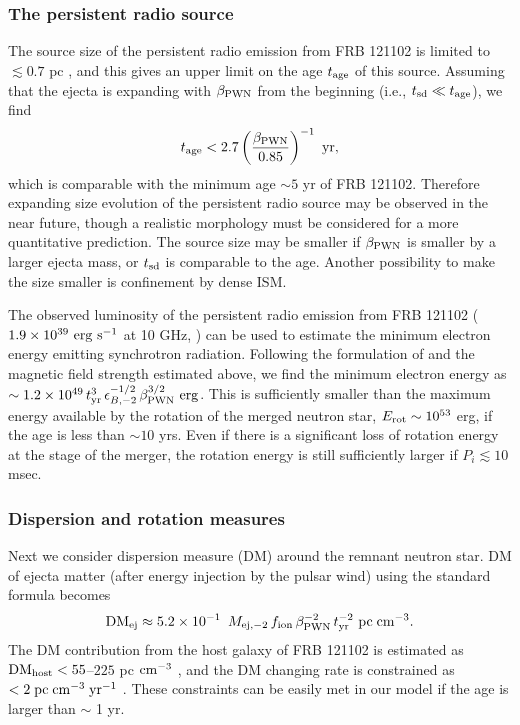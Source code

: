 \documentclass[]{pasj01}
\begin{document}
\subsubsection{The persistent radio source}

The source size of the persistent radio emission from FRB 121102
is limited to 
$\lesssim0.7$ pc \citep{Marcote2017}, and this
gives an upper limit on the age $t_{\rm age}$ of this source. 
Assuming that the ejecta is expanding with $\beta_{\rm PWN}$
from the beginning (i.e., $t_{\rm sd} \ll t_{\rm age}$), 
we find 
\begin{eqnarray}
t_{\rm age} < 2.7  \left( \frac{\beta_{\rm PWN}}{0.85} \right)^{-1}  \ \rm yr, 
\end{eqnarray}
which is comparable with the minimum age $\sim5$ yr of FRB 121102.
Therefore expanding size evolution of the persistent radio source may
be observed in the near future, though a realistic morphology must be
considered for a more quantitative prediction.  The source size may be
smaller if $\beta_{\rm PWN}$ is smaller by a larger ejecta mass, or
$t_{\rm sd}$ is comparable to the age.  Another possibility to make the
size smaller is confinement by dense ISM.

The observed luminosity of the persistent radio emission from FRB
121102 ($1.9 \times 10^{39} \ {\rm erg \ s^{-1}}$ at 10 GHz,
\cite{Chatterjee2017}) can be used to estimate the minimum electron
energy emitting synchrotron radiation. Following the formulation of
\citet{Kashiyama&Murase2017} and the magnetic field strength estimated
above, we find the minimum electron energy as $\sim 1.2 \times 10^{49}
\, t_{\rm yr}^{3} \,\epsilon_{B,-2}^{-1/2} \, \beta_{\rm PWN}^{3/2}
\ {\rm erg}$.  This is sufficiently smaller than the maximum energy
available by the rotation of the merged neutron star, $E_{\rm rot}
\sim 10^{53}$ erg, if the age is less than $\sim 10$ yrs.
Even if there is a significant loss of rotation energy at the
stage of the merger, the rotation energy is still sufficiently
larger if $P_i \lesssim 10$ msec.


\subsubsection{Dispersion and rotation measures}

Next we consider dispersion measure (DM) around the remnant neutron
star. DM of ejecta matter (after energy injection by the pulsar
wind) using the standard formula becomes
\begin{eqnarray}
    {\rm DM}_{\rm ej}\approx 5.2\times10^{-1}\
\, M_{{\rm ej},-2}\,f_{\rm ion}\, \beta_{\rm PWN}^{-2}\,t_{\rm yr}^{-2} 
\  {\rm pc \; cm^{-3}} . 
\end{eqnarray}
The DM
contribution from the host galaxy of FRB 121102 is estimated as ${\rm
  DM}_{\rm host}<55$--$225$ pc ${\rm cm}^{-3}$
\citep{Tendulkar2017,Kokubo2017}, and
the DM changing rate is constrained as $< 2 \;{\rm pc \;cm^{-3}\;
  yr^{-1}}$ \citep{Piro2016}.  These constraints can be
easily met in our model
if the age is larger than $\sim$ 1 yr. 
\end{document}
